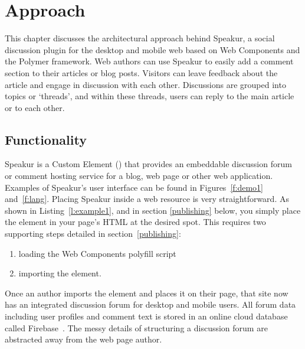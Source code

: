 \chapter{Approach}
%
\label{ch:approach}

This chapter discusses the architectural approach behind Speakur, 
a social discussion plugin for the desktop and mobile web based on Web Components and the Polymer framework.
Web authors can use Speakur to easily add a comment section to their articles or blog posts.
Visitors can leave feedback about the article and engage in discussion with each other.
Discussions are grouped into topics or `threads', and within these threads, users can reply to the main article or to each other.

\section{Functionality}
Speakur 
is a Custom Element 
() 
that provides an embeddable discussion forum or comment hosting service for a blog, web page or other web application.
Examples of Speakur's user interface can be found in Figures~\ref{f:demo1} and~\ref{f:lang}.
Placing Speakur inside a web resource is very straightforward.
As shown in Listing~\ref{l:example1},
and in section \ref{publishing} below,
you simply place the 
 element in your page's HTML at the desired spot.
This requires two supporting steps detailed in section~\ref{publishing}:
\begin{enumerate}
\item loading the Web Components polyfill script
\item importing the  element.
\end{enumerate}

Once an author imports the element and places it on their page, that site now has an integrated discussion forum for desktop and mobile users. 
All forum data including user profiles and comment text is stored in an online cloud database called Firebase~\cite{firebasecontributors2015}.
The messy details of structuring a discussion forum are abstracted away from the web page author.

